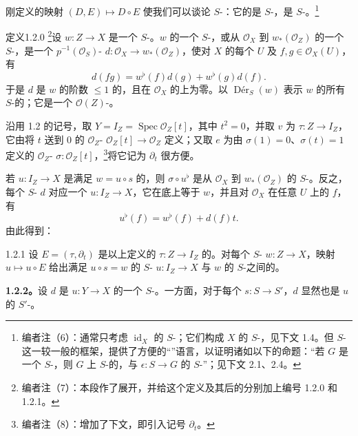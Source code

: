 刚定义的映射 $(D,E)\mapsto D\circ E$ 使我们可以谈论 $S$-：它的是 $S$-，是 $S$-。\footnote{编者注（6）：通常只考虑 $\operatorname{id}_X$ 的 $S$-；它们构成 $X$ 的 $S$-，见下文 1.4。但 $S$-这一较一般的框架，提供了方便的“”语言，以证明诸如以下的命题：“若 $G$ 是一个 $S$-，则 $G$ 上 $S$-的，与 $\epsilon:S\to G$ 的 $S$-”；见下文 2.1、2.4。}

\begin{SGAresult}{定义}{1.2.0}
\footnote{编者注（7）：本段作了展开，并给这个定义及其后的分别加上编号 1.2.0 和 1.2.1。}设 $w:Z\to X$ 是一个 $S$-。$w$ 的一个 $S$-，或从 $\mathcal O_X$ 到 $w_*(\mathcal O_Z)$ 的一个 $S$-，是一个 $p^{-1}(\mathcal O_S)$- $d:\mathcal O_X\to w_*(\mathcal O_Z)$，使对 $X$ 的每个 $U$ 及 $f,g\in\mathcal O_X(U)$，有
\[
d(fg)=w^\flat(f)d(g)+w^\flat(g)d(f).
\]
于是 $d$ 是 $w$ 的阶数 $\leq1$ 的，且在 $\mathcal O_X$ 的上为零。以 $\operatorname{D\text{é}r}_S(w)$ 表示 $w$ 的所有 $S$-的；它是一个 $\mathcal O(Z)$-。
\end{SGAresult}
沿用 1.2 的记号，取 $Y=I_Z=\operatorname{Spec}\mathcal O_Z[t]$，其中 $t^2=0$，并取 $v$ 为 $\tau:Z\to I_Z$，它由将 $t$ 送到 $0$ 的 $\mathcal O_Z$- $\mathcal O_Z[t]\to\mathcal O_Z$ 定义；又取 $e$ 为由 $\sigma(1)=0$、$\sigma(t)=1$ 定义的 $\mathcal O_Z$- $\sigma:\mathcal O_Z[t]$，\footnote{编者注（8）：增加了下文，即引入记号 $\partial_t$。}将它记为 $\partial_t$ 很方便。

若 $u:I_Z\to X$ 是满足 $w=u\circ s$ 的，则 $\sigma\circ u^\flat$ 是从 $\mathcal O_X$ 到 $w_*(\mathcal O_Z)$ 的 $S$-。反之，每个 $S$- $d$ 对应一个 $u:I_Z\to X$，它在底上等于 $w$，并且对 $\mathcal O_X$ 在任意 $U$ 上的 $f$，有
\[
u^\flat(f)=w^\flat(f)+d(f)t.
\]
由此得到：
\begin{SGAresult}{}{1.2.1}
设 $E=(\tau,\partial_t)$ 是以上定义的 $\tau:Z\to I_Z$ 的。对每个 $S$- $w:Z\to X$，映射 $u\mapsto u\circ E$ 给出满足 $u\circ s=w$ 的 $S$- $u:I_Z\to X$ 与 $w$ 的 $S$-之间的。
\end{SGAresult}
\textbf{1.2.2。}设 $d$ 是 $u:Y\to X$ 的一个 $S$-。一方面，对于每个 $s:S\to S'$，$d$ 显然也是 $u$ 的 $S'$-。

